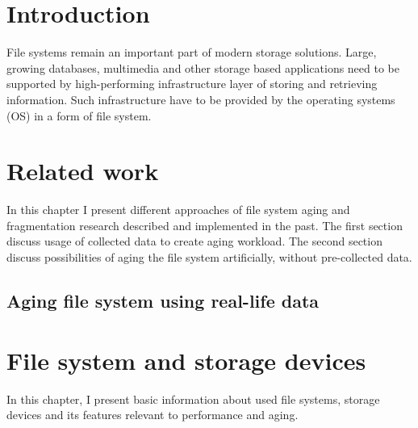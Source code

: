 \documentclass[
  color, %
  table, %
  lof,   %
  lot,   %
]{fithesis3}
\begin{document}
\chapter{Introduction}
File systems remain an important part of modern storage solutions. Large, growing databases, multimedia and other storage based applications need to be supported by high-performing infrastructure layer of storing and retrieving information. Such infrastructure have to be provided by the operating systems (OS) in a form of file system.




\chapter{Related work}
\label{related}
In this chapter I present different approaches of file system aging and fragmentation research described and implemented in the past. The first section discuss usage of collected data to create aging workload. The second section discuss possibilities of aging the file system artificially, without pre-collected data.

\section{Aging file system using real-life data}


\chapter{File system and storage devices}
\label{fs}
In this chapter, I present basic information about used file systems, storage devices and its features relevant to performance and aging.
\end{document}
